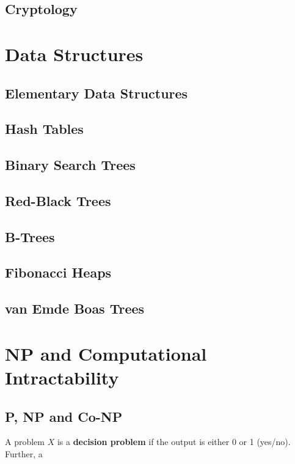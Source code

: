 		\section{Cryptology}

	\chapter{Data Structures}
		\section{Elementary Data Structures}

		\section{Hash Tables}

		\section{Binary Search Trees}

		\section{Red-Black Trees}

		\section{B-Trees}

		\section{Fibonacci Heaps}

		\section{van Emde Boas Trees}

	\chapter{NP and Computational Intractability}
		\section{P, NP and Co-NP}
			\begin{definition}
				A problem $X$ is a \textbf{decision problem} if the output is either 0 or 1 (yes/no). Further, a 
			\end{definition}

